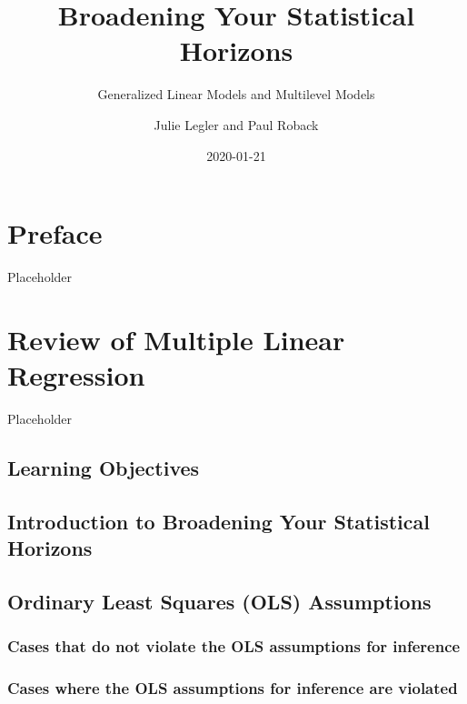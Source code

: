 \documentclass[
]{krantz}
\title{Broadening Your Statistical Horizons}
\subtitle{Generalized Linear Models and Multilevel Models}
\author{Julie Legler and Paul Roback}
\date{2020-01-21}
\begin{document}
\maketitle

{
\hypersetup{linkcolor=}
\setcounter{tocdepth}{2}
\tableofcontents
}
\listoftables
\listoffigures
\hypertarget{preface}{%
\chapter*{Preface}\label{preface}}


Placeholder

\hypertarget{ch-MLRreview}{%
\chapter{Review of Multiple Linear Regression}\label{ch-MLRreview}}

Placeholder

\hypertarget{learning-objectives}{%
\section{Learning Objectives}\label{learning-objectives}}

\hypertarget{introduction-to-broadening-your-statistical-horizons}{%
\section{Introduction to Broadening Your Statistical Horizons}\label{introduction-to-broadening-your-statistical-horizons}}

\hypertarget{ordinary-least-squares-ols-assumptions}{%
\section{Ordinary Least Squares (OLS) Assumptions}\label{ordinary-least-squares-ols-assumptions}}

\hypertarget{cases-that-do-not-violate-the-ols-assumptions-for-inference}{%
\subsection{Cases that do not violate the OLS assumptions for inference}\label{cases-that-do-not-violate-the-ols-assumptions-for-inference}}

\hypertarget{cases-where-the-ols-assumptions-for-inference-are-violated}{%
\subsection{Cases where the OLS assumptions for inference are violated}\label{cases-where-the-ols-assumptions-for-inference-are-violated}}
\end{document}
